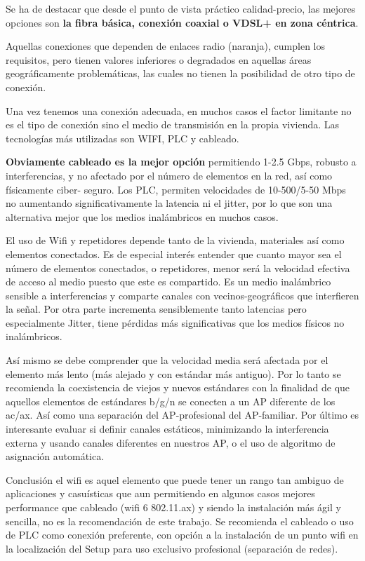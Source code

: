 Se ha de destacar que desde el punto de vista práctico calidad-precio, las mejores opciones son \textbf{la fibra básica, conexión coaxial o VDSL+ \cite{c_dsl_tech} en zona céntrica}.

Aquellas conexiones que dependen de enlaces radio (naranja), cumplen los requisitos, pero tienen valores inferiores o degradados en aquellas áreas geográficamente problemáticas, las cuales no tienen la posibilidad de otro tipo de conexión.

Una vez tenemos una conexión adecuada, en muchos casos el factor limitante no es el tipo de conexión sino el medio de transmisión en la propia vivienda. Las tecnologías más utilizadas son WIFI, PLC\cite{c_plc_tech} y cableado.

\textbf{Obviamente cableado es la mejor opción }permitiendo 1-2.5 Gbps, robusto a interferencias, y no afectado por el número de elementos en la red, así como físicamente ciber- seguro.
Los PLC, permiten velocidades de 10-500/5-50 Mbps no aumentando significativamente la latencia ni el jitter, por lo que son una alternativa mejor que los medios inalámbricos en muchos casos.

El uso de Wifi y repetidores depende tanto de la vivienda, materiales así como elementos conectados. Es de especial interés entender que cuanto mayor sea el número de elementos conectados, o repetidores, menor será la velocidad efectiva de acceso al medio puesto que este es compartido. Es un medio inalámbrico sensible a interferencias y comparte canales con vecinos-geográficos que interfieren la señal. Por otra parte incrementa sensiblemente tanto latencias pero especialmente Jitter, tiene pérdidas más significativas que los medios físicos no inalámbricos.

Así mismo se debe comprender que la velocidad media será afectada por el elemento más lento (más alejado y con estándar más antiguo). Por lo tanto se recomienda la coexistencia de viejos y nuevos estándares con la finalidad de que aquellos elementos de estándares b/g/n se conecten a un AP diferente de los ac/ax. Así como una separación del AP-profesional del AP-familiar. Por último es interesante evaluar si definir canales estáticos, minimizando la interferencia externa y usando canales diferentes en nuestros AP, o el uso de algoritmo de asignación automática.

Conclusión el wifi es aquel elemento que puede tener un rango tan ambiguo de aplicaciones y casuísticas que aun permitiendo en algunos casos mejores performance que cableado (wifi 6 802.11.ax) y siendo la instalación más ágil y sencilla, no es la recomendación de este trabajo. Se recomienda el cableado o uso de PLC  como conexión preferente, con opción a la instalación de un punto wifi en la localización del Setup para uso exclusivo profesional (separación de redes).

